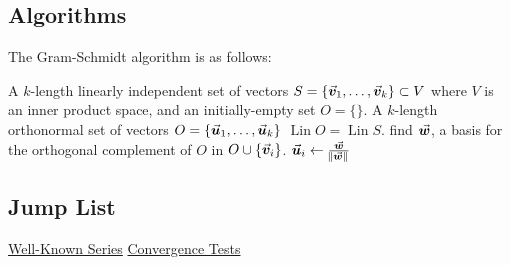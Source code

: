\documentclass[MathsNotesBase.tex]{subfiles}
\begin{document}
	
	\subsection{Algorithms}
	The Gram-Schmidt algorithm is as follows:
	\begin{algorithm}
		\begin{algorithmic}
			\REQUIRE A $k$-length linearly independent set of vectors ${ S = \{\vec{\bm{v}}_1,\dots,\vec{\bm{v}}_k\} \subset V }$ where $V$ is an inner product space, and an initially-empty set ${ O = \{\} }$.
			\ENSURE A $k$-length orthonormal set of vectors ${ O = \{\vec{\bm{u}}_1, \dots, \vec{\bm{u}}_k \} }$ \suchthat ${ \operatorname{Lin} O = \operatorname{Lin} S }$.
			\STATE %
			\STATE find $\vec{\bm{w}}$, a basis for the orthogonal complement of $O$ in ${ O \cup \{\vec{\bm{v}}_i\} }$.
			\STATE ${ \vec{\bm{u}}_i \leftarrow \frac{\vec{\bm{w}}}{\norm{\vec{\bm{w}}}} }$
			\ENDFOR 
		\end{algorithmic}	
	\end{algorithm}

	\subsection{Jump List}
	{\tiny 
		\hyperref[ssssection:well-known-non-negative-series]{Well-Known Series} \hspace{20pt} \hyperref[ssssection:convergence-tests-for-non-negative-series]{Convergence Tests}
	}
	
\end{document}
